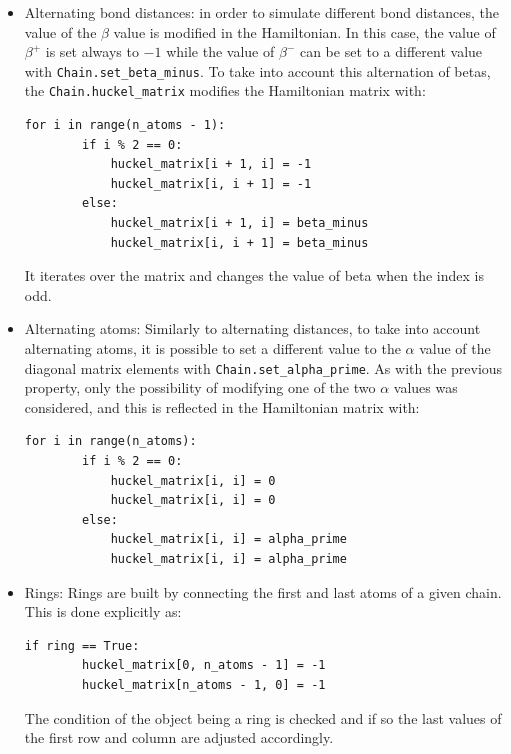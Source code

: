 \documentclass[twocolumn]{article}
\begin{document}
\begin{itemize}
    \item Alternating bond distances: in order to simulate different bond distances, the value of the \(\beta\) value is modified in the Hamiltonian. In this case, the value of \(\beta^+\) is set always to \(-1\) while the value of \(\beta^-\) can be set to a different value with \texttt{Chain.set\_beta\_minus}. To take into account this alternation of betas, the \texttt{Chain.huckel\_matrix} modifies the Hamiltonian matrix with:
\begin{lstlisting}[backgroundcolor=\color{LightGray}]
    for i in range(n_atoms - 1):
        if i % 2 == 0:
            huckel_matrix[i + 1, i] = -1 
            huckel_matrix[i, i + 1] = -1
        else:
            huckel_matrix[i + 1, i] = beta_minus
            huckel_matrix[i, i + 1] = beta_minus
\end{lstlisting} 
    It iterates over the matrix and changes the value of beta when the index is odd. 
    \item Alternating atoms: Similarly to alternating distances, to take into account alternating atoms, it is possible to set a different value to the $\alpha$ value of the diagonal matrix elements with \texttt{Chain.set\_alpha\_prime}. As with the previous property, only the possibility of modifying one of the two $\alpha$ values was considered, and this is reflected in the Hamiltonian matrix with:
\begin{lstlisting}[backgroundcolor=\color{LightGray}]
    for i in range(n_atoms):
        if i % 2 == 0:
            huckel_matrix[i, i] = 0
            huckel_matrix[i, i] = 0
        else:
            huckel_matrix[i, i] = alpha_prime
            huckel_matrix[i, i] = alpha_prime
\end{lstlisting} 
    
    \item Rings: Rings are built by connecting the first and last atoms of a given chain. This is done explicitly as:
\begin{lstlisting}[backgroundcolor=\color{LightGray}]
    if ring == True:
        huckel_matrix[0, n_atoms - 1] = -1
        huckel_matrix[n_atoms - 1, 0] = -1
\end{lstlisting} 
The condition of the object being a ring is checked and if so the last values of the first row and column are adjusted accordingly. 
        
\end{itemize}
\end{document}
